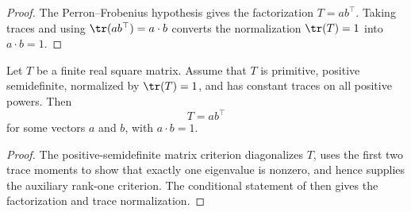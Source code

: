 \begin{proof}
    \leanok
    The Perron--Frobenius hypothesis gives the factorization $T = a b^\top$.
    Taking traces and using $\tr(a b^\top) = a \cdot b$ converts the
    normalization $\tr(T) = 1$ into $a \cdot b = 1$.
\end{proof}

\begin{theorem}
    \label{thm:psd_trace_powers_rank_one_t}
    \leanok
    Let $T$ be a finite real square matrix. Assume that $T$ is primitive,
    positive semidefinite, normalized by $\tr(T)=1$, and has constant traces on
    all positive powers. Then
    \[
        T = a b^\top
    \]
    for some vectors $a$ and $b$, with $a \cdot b = 1$.
\end{theorem}

\begin{proof}
    \leanok
    The positive-semidefinite matrix criterion diagonalizes $T$, uses the first
    two trace moments to show that exactly one eigenvalue is nonzero, and hence
    supplies the auxiliary rank-one criterion. The conditional statement of
    \cite[Lemma~C.5]{Cirac2016MPDO_arXiv} then gives the factorization and
    trace normalization.
\end{proof}

